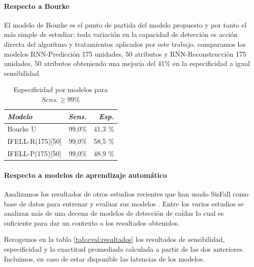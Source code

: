 \documentclass[11pt,a4paper,spanish,twocolumn]{article}
\begin{document}
\paragraph{Respecto a Bourke}
El modelo de Bourke es el punto de partida del modelo propuesto y por tanto el más simple de estudiar: toda variación en la capacidad de detección es acción directa del algoritmo y tratamientos aplicados por este trabajo. comparamos los modelos RNN-Predicción 175 unidades, 50 atributos y RNN-Reconstrucción 175 unidades, 50 atributos obteniendo una mejoría del 41\% en la especificidad a igual sensibilidad.

\begin{table}\caption{\label{tab:ifell:vs:bourke} Especificidad por modelos para $Sens. \geq 99\%$}
  \centering
  \begin{tabular}{lrr}\toprule
    \emph{Modelo}     & \emph{Sens.} & \emph{Esp.} \\\midrule
    Bourke U          & 99,0\%    & 41,3 \% \\                
    IFELL-R(175)[50]    & 99,0\%  & 58,5 \% \\
    IFELL-P(175)[50]    & 99,0\%  & 48,9 \% \\\bottomrule
  \end{tabular}
\end{table}

\paragraph{Respecto a modelos de aprendizaje automático}
Analizamos los resultados de otros estudios recientes que han usado SisFall como base de datos para entrenar y evaluar sus modelos \cite{Torti2018,Liu2018,Liu2020,Musci2020}. Entre los varios estudios se analizan más de una decena de modelos de detección de caídas lo cual es suficiente para dar un contexto a los resultados obtenidos. 

Recogemos en la tabla \ref{tab:eval:resultados} los resultados de sensibilidad, especificidad y la exactitud promediada calculada a partir de las dos anteriores. Incluimos, en caso de estar disponible las latencias de los modelos. 
\end{document}
